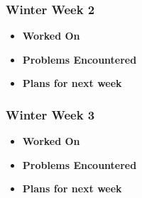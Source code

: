 \documentclass[compsoc,draftclsnofoot,onecolumn,10pt]{IEEEtran}
\begin{document}
\subsubsection{Winter Week 2}
\begin{itemize}
    \item {\textbf{Worked On}}
    \begin{itemize}

    \end{itemize}

    \item {\textbf{Problems Encountered}}
    \begin{itemize}

    \end{itemize}

    \item{\textbf{Plans for next week}}
    \begin{itemize}

    \end{itemize}

\end{itemize}

\subsubsection{Winter Week 3}
\begin{itemize}
    \item {\textbf{Worked On}}
    \begin{itemize}

    \end{itemize}

    \item {\textbf{Problems Encountered}}
    \begin{itemize}

    \end{itemize}

    \item{\textbf{Plans for next week}}
    \begin{itemize}

    \end{itemize}

\end{itemize}
\end{document}
